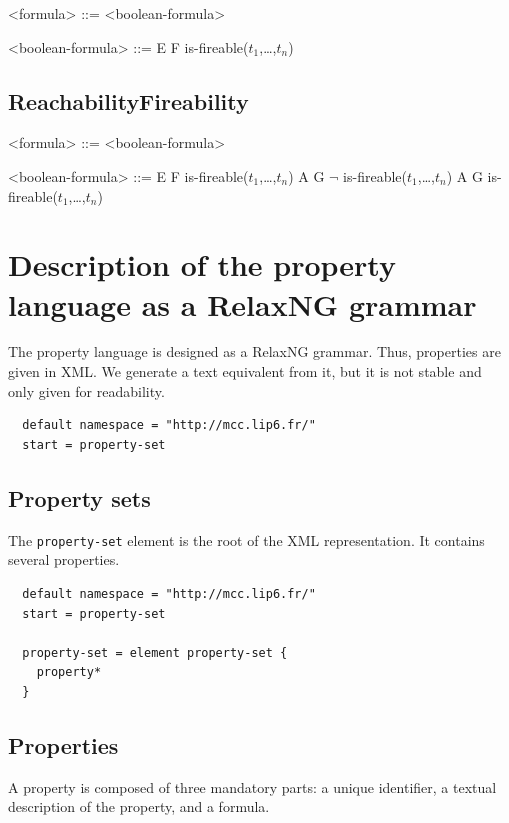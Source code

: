 \documentclass[10pt,english,a4paper]{article}
\begin{document}
\begin{grammar}

<formula> ::= <boolean-formula> 

<boolean-formula> ::= E F is-fireable($t_1$,\dots,$t_n$)

\end{grammar}

\subsection{ReachabilityFireability}

\begin{grammar}

<formula> ::= <boolean-formula>

<boolean-formula> ::= E F is-fireable($t_1$,\dots,$t_n$)
\alt A G $\lnot$ is-fireable($t_1$,\dots,$t_n$)
\alt A G is-fireable($t_1$,\dots,$t_n$)

\end{grammar}


\section{Description of the property language as a RelaxNG grammar}
The property language is designed as a RelaxNG grammar. Thus, properties are given in XML.
We generate a text equivalent from it, but it is not stable and only given for readability.

\begin{lstlisting}
  default namespace = "http://mcc.lip6.fr/"
  start = property-set
\end{lstlisting}
\subsection{Property sets}
The \lstinline[language=xsd]!property-set! element is the root of the XML representation.
It contains several properties.
\begin{lstlisting}
  default namespace = "http://mcc.lip6.fr/"
  start = property-set

  property-set = element property-set {
    property*
  }
\end{lstlisting}

\subsection{Properties}
A property is composed of three mandatory parts: a unique identifier, a textual description
of the property, and a formula.
\end{document}
